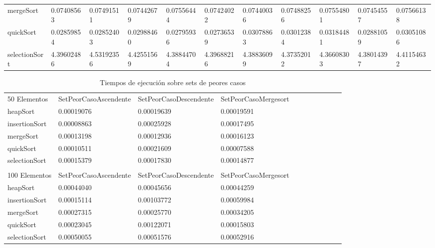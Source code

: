 \documentclass[article,a4paper]{article}
\begin{document}
\begin{table}[h]
{\begin{tabular}{lllllllllll}
mergeSort       & 0.07408563  & 0.07491511  & 0.07442679  & 0.07556444  & 0.07424022  & 0.07440036  & 0.07488256  & 0.07554801  & 0.07454557  & 0.07566138  \\
quickSort       & 0.02859854  & 0.02852403  & 0.02988460  & 0.02795936  & 0.02736539  & 0.03078863  & 0.03012384  & 0.03184481  & 0.02881059  & 0.03051086  \\
selectionSort   & 4.39602486  & 4.53192356  & 4.42551569  & 4.38844704  & 4.39688216  & 4.38836099  & 4.37352012  & 4.36608303  & 4.38014397  & 4.41154632
\end{tabular}}
\end{table}

\begin{table}[h]
\centering
\caption{Tiempos de ejecución sobre sets de peores casos}
\begin{adjustbox}{width=\textwidth,totalheight=\textheight,keepaspectratio}
\tiny
\begin{tabular}{lllllllllll}
50 Elementos    & SetPeorCasoAscendente & SetPeorCasoDescendente & SetPeorCasoMergesort \\
heapSort        & 0.00019076            & 0.00019639             & 0.00019591           \\
insertionSort   & 0.00008863            & 0.00025928             & 0.00017495           \\
mergeSort       & 0.00013198            & 0.00012936             & 0.00016123           \\
quickSort       & 0.00010511            & 0.00021609             & 0.00007588           \\
selectionSort   & 0.00015379            & 0.00017830             & 0.00014877           \\
                &                       &                        &                      \\
100 Elementos   & SetPeorCasoAscendente & SetPeorCasoDescendente & SetPeorCasoMergesort \\
heapSort        & 0.00044040            & 0.00045656             & 0.00044259           \\
insertionSort   & 0.00015114            & 0.00103772             & 0.00059984           \\
mergeSort       & 0.00027315            & 0.00025770             & 0.00034205           \\
quickSort       & 0.00023045            & 0.00122071             & 0.00015803           \\
selectionSort   & 0.00050055            & 0.00051576             & 0.00052916           \\

\end{tabular}
\end{adjustbox}
\end{table}
\end{document}
